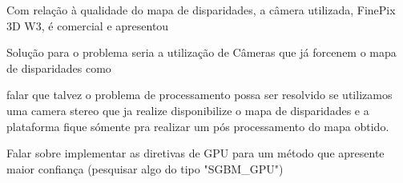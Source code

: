 Com relação à qualidade do mapa de disparidades, a câmera utilizada, FinePix 3D W3, é comercial e apresentou 

Solução para o problema seria a utilização de Câmeras que já forcenem o mapa de disparidades como





 falar que talvez o problema de processamento possa ser resolvido se utilizamos uma camera stereo que ja realize disponibilize o mapa de disparidades e a plataforma fique sómente pra realizar um pós processamento do mapa obtido.
 
 Falar sobre implementar as diretivas de GPU para um método que apresente maior confiança (pesquisar algo do tipo "SGBM_GPU")








